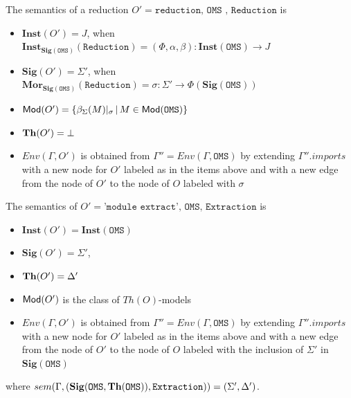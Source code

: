 \documentclass[10pt,fleqn,%
\ifpretendfinal
final%
\else
draft%
\fi,
]{scrreprt}
\newcommand*{\syntax}[1]{\texttt{#1}}
\newcommand{\Sig}{\mathbf{Sig}}
\newcommand{\Mor}{\mathbf{Mor}}
\newcommand{\Inst}{\ensuremath{\mathbf{Inst}}}
\begin{document}
The semantics of a reduction
$O' = \syntax{reduction, OMS , Reduction}$
is
\begin{itemize}

  \item $\Inst(O') = J$, when $\Inst_{\Sig(\syntax{OMS})}(\syntax{Reduction})
  = (\Phi, \alpha, \beta) : \Inst(\syntax{OMS}) \to J$
  \item $\Sig(O') = \Sigma'$, when
   $\Mor_{\Sig(\syntax{OMS})}(\syntax{Reduction}) = \sigma:\Sigma'\to
    \Phi(\Sig(\syntax{OMS}))$
  \item $\Mod(O') = \{\beta_\Sigma(M)\forget{\sigma} \,|\, M\in \Mod(\syntax{OMS})\}$
  \item $\mathbf{Th}(O') = \bot$
  \item $Env(\Gamma, O')$ is obtained from 
       $\Gamma'' = Env(\Gamma, \syntax{OMS})$
       by extending $\Gamma''.imports$
        with a new node for $O'$ labeled as in the items above
        and with a new edge from the node of $O'$ to the node of $O$ labeled with
        $\sigma$

\end{itemize}


The semantics of $O' = \syntax{'module extract', OMS, 
Extraction}$ is
\begin{itemize}
  \item $\Inst(O') = \Inst(\syntax{OMS})$
  \item $\Sig(O') = \Sigma'$,
     
  \item $\mathbf{Th}(O') = \Delta'$
  \item $\mathsf{Mod}(O')$ is the class of $Th(O)$-models
  \item $Env(\Gamma, O')$ is obtained from 
       $\Gamma'' = Env(\Gamma, \syntax{OMS})$
       by extending $\Gamma''.imports$
        with a new node for $O'$ labeled as in the items above
        and with a new edge from the node of $O'$ to the node of $O$ labeled with
        the inclusion of $\Sigma'$ in $\Sig(\syntax{OMS})$
\end{itemize}
where 
$sem(\Gamma, (\Sig(\syntax{OMS}, \Th(\syntax{OMS})), \syntax{Extraction})) = 
(\Sigma',\Delta')$.
\end{document}

